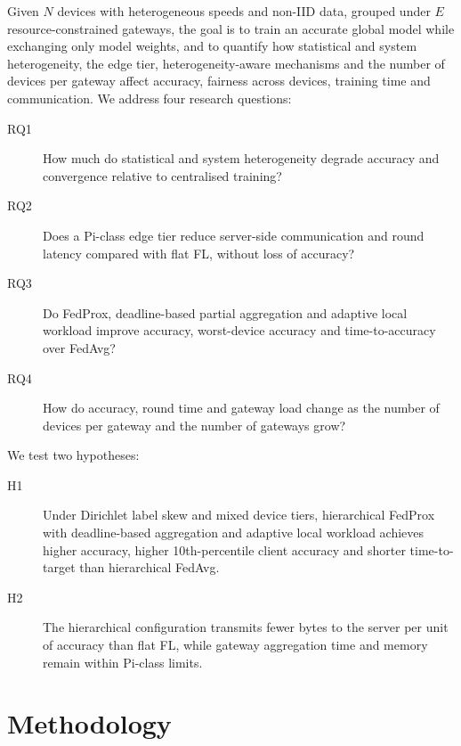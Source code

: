 \documentclass[conference]{IEEEtran}
\begin{document}
Given $N$ devices with heterogeneous speeds and non-IID data, grouped under $E$ resource-constrained gateways, the goal is to train an accurate global model while exchanging only model weights, and to quantify how statistical and system heterogeneity, the edge tier, heterogeneity-aware mechanisms and the number of devices per gateway affect accuracy, fairness across devices, training time and communication. We address four research questions:

\begin{description}
\item[RQ1] How much do statistical and system heterogeneity degrade accuracy and convergence relative to centralised training?
\item[RQ2] Does a Pi-class edge tier reduce server-side communication and round latency compared with flat FL, without loss of accuracy?
\item[RQ3] Do FedProx, deadline-based partial aggregation and adaptive local workload improve accuracy, worst-device accuracy and time-to-accuracy over FedAvg?
\item[RQ4] How do accuracy, round time and gateway load change as the number of devices per gateway and the number of gateways grow?
\end{description}

\noindent We test two hypotheses:

\begin{description}
\item[H1] Under Dirichlet label skew and mixed device tiers, hierarchical FedProx with deadline-based aggregation and adaptive local workload achieves higher accuracy, higher 10th-percentile client accuracy and shorter time-to-target than hierarchical FedAvg.
\item[H2] The hierarchical configuration transmits fewer bytes to the server per unit of accuracy than flat FL, while gateway aggregation time and memory remain within Pi-class limits.
\end{description}

\section{Methodology}
\label{sec:method}
\end{document}
